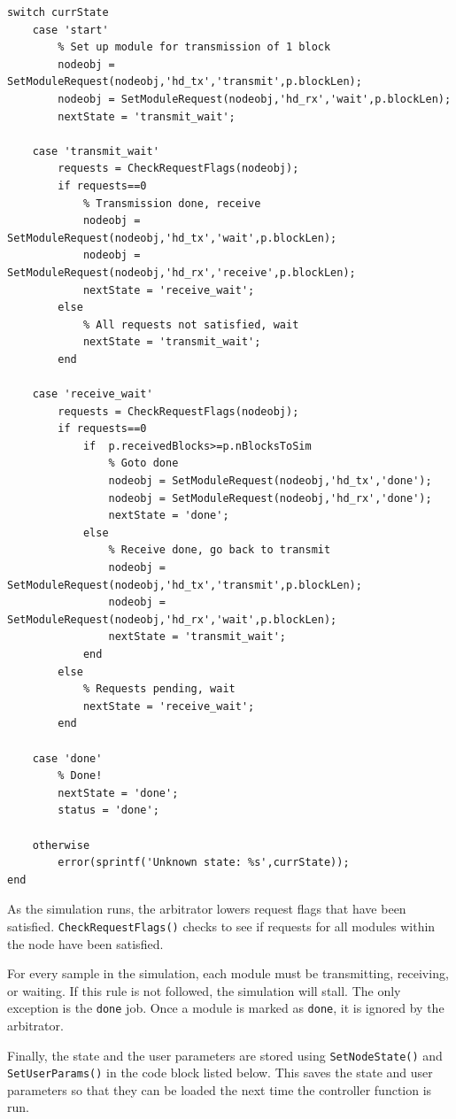 \begin{lstlisting}[name=hdState]
% State machine next-state and output "logic"
switch currState
    case 'start'
        % Set up module for transmission of 1 block
        nodeobj = SetModuleRequest(nodeobj,'hd_tx','transmit',p.blockLen);
        nodeobj = SetModuleRequest(nodeobj,'hd_rx','wait',p.blockLen);
        nextState = 'transmit_wait';

    case 'transmit_wait'
        requests = CheckRequestFlags(nodeobj);
        if requests==0
            % Transmission done, receive
            nodeobj = SetModuleRequest(nodeobj,'hd_tx','wait',p.blockLen);
            nodeobj = SetModuleRequest(nodeobj,'hd_rx','receive',p.blockLen);
            nextState = 'receive_wait';
        else
            % All requests not satisfied, wait
            nextState = 'transmit_wait';
        end

    case 'receive_wait'
        requests = CheckRequestFlags(nodeobj);
        if requests==0
            if  p.receivedBlocks>=p.nBlocksToSim
                % Goto done
                nodeobj = SetModuleRequest(nodeobj,'hd_tx','done');
                nodeobj = SetModuleRequest(nodeobj,'hd_rx','done');
                nextState = 'done';
            else
                % Receive done, go back to transmit
                nodeobj = SetModuleRequest(nodeobj,'hd_tx','transmit',p.blockLen);
                nodeobj = SetModuleRequest(nodeobj,'hd_rx','wait',p.blockLen);
                nextState = 'transmit_wait';
            end
        else
            % Requests pending, wait
            nextState = 'receive_wait';
        end

    case 'done'
        % Done!
        nextState = 'done';
        status = 'done';

    otherwise
        error(sprintf('Unknown state: %s',currState));
end

\end{lstlisting}

As the simulation runs, the arbitrator lowers request flags that
have been satisfied.  \verb+CheckRequestFlags()+ checks to see if
requests for all modules within the node have been satisfied.

For every sample in the simulation, each module must be
transmitting, receiving, or waiting.  If this rule is not followed,
the simulation will stall.  The only exception is the \verb+done+
job. Once a module is marked as \verb+done+, it is ignored by the
arbitrator.

Finally, the state and the user parameters are stored using
\verb+SetNodeState()+ and \verb+SetUserParams()+ in the code block
listed below.  This saves the state and user parameters so that they
can be loaded the next time the controller function is run.

